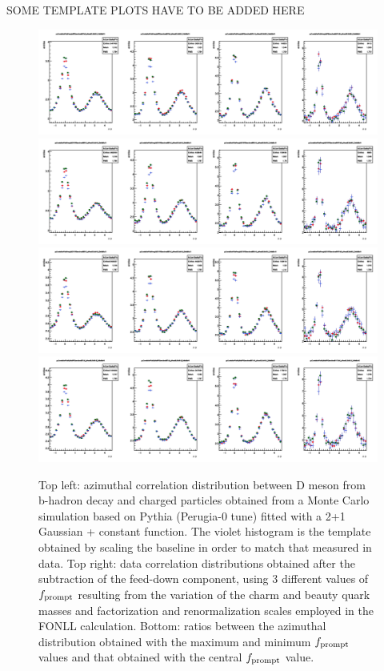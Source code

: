 SOME TEMPLATE PLOTS HAVE TO BE ADDED HERE


\begin{figure}
\centering
\includegraphics[width=1\linewidth]{figures/Template/1DCompare_allDpTfromB_AssoPt_0dot3to99dot0GeVc_Perugia0.png}
\includegraphics[width=1\linewidth]{figures/Template/1DCompare_allDpTfromB_AssoPt_0dot3to99dot0GeVc_Perugia2010.png}
\includegraphics[width=1\linewidth]{figures/Template/1DCompare_allDpTfromB_AssoPt_0dot3to99dot0GeVc_Perugia2011.png}
\includegraphics[width=1\linewidth]{figures/Template/1DCompare_allDpTfromB_AssoPt_0dot3to99dot0GeVc_Pythia8.png}
\caption{Top left: azimuthal correlation distribution between D meson from b-hadron decay and charged particles obtained from a Monte Carlo simulation
based on Pythia (Perugia-0 tune) fitted with a 2+1 Gaussian + constant function. The violet histogram is the template obtained by scaling the baseline
in order to match that measured in data. Top right: data correlation distributions obtained after the subtraction of the feed-down component, using 3 different values of $f_{\rm prompt}$ resulting
from the variation of the charm and beauty quark masses and factorization and renormalization scales employed in the FONLL calculation. Bottom: ratios between the azimuthal
distribution obtained with the maximum and minimum $f_{\rm prompt}$ values and that obtained with the central $f_{\rm prompt}$ value.}
\label{templates1}
\end{figure}


